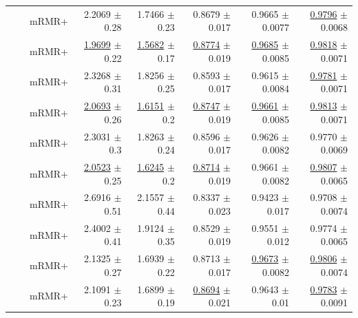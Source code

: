 \begin{longtable}{llp{}rrrrr}
 &  & mRMR+ & 2.2069 {\scriptsize $\pm$ 0.28} & 1.7466 {\scriptsize $\pm$ 0.23} & 0.8679 {\scriptsize $\pm$ 0.017} & 0.9665 {\scriptsize $\pm$ 0.0077} & \underline{0.9796} {\scriptsize $\pm$ 0.0068} \\
 &  & mRMR+ & \underline{1.9699} {\scriptsize $\pm$ 0.22} & \underline{1.5682} {\scriptsize $\pm$ 0.17} & \underline{0.8774} {\scriptsize $\pm$ 0.019} & \underline{0.9685} {\scriptsize $\pm$ 0.0085} & \underline{0.9818} {\scriptsize $\pm$ 0.0071} \\
 &  & mRMR+ & 2.3268 {\scriptsize $\pm$ 0.31} & 1.8256 {\scriptsize $\pm$ 0.25} & 0.8593 {\scriptsize $\pm$ 0.017} & 0.9615 {\scriptsize $\pm$ 0.0084} & \underline{0.9781} {\scriptsize $\pm$ 0.0071} \\
 &  & mRMR+ & \underline{2.0693} {\scriptsize $\pm$ 0.26} & \underline{1.6151} {\scriptsize $\pm$ 0.2} & \underline{0.8747} {\scriptsize $\pm$ 0.019} & \underline{0.9661} {\scriptsize $\pm$ 0.0085} & \underline{0.9813} {\scriptsize $\pm$ 0.0071} \\
 &  & mRMR+ & 2.3031 {\scriptsize $\pm$ 0.3} & 1.8263 {\scriptsize $\pm$ 0.24} & 0.8596 {\scriptsize $\pm$ 0.017} & 0.9626 {\scriptsize $\pm$ 0.0082} & 0.9770 {\scriptsize $\pm$ 0.0069} \\
 &  & mRMR+ & \underline{2.0523} {\scriptsize $\pm$ 0.25} & \underline{1.6245} {\scriptsize $\pm$ 0.2} & \underline{0.8714} {\scriptsize $\pm$ 0.019} & 0.9661 {\scriptsize $\pm$ 0.0082} & \underline{0.9807} {\scriptsize $\pm$ 0.0065} \\
 &  & mRMR+ & 2.6916 {\scriptsize $\pm$ 0.51} & 2.1557 {\scriptsize $\pm$ 0.44} & 0.8337 {\scriptsize $\pm$ 0.023} & 0.9423 {\scriptsize $\pm$ 0.017} & 0.9708 {\scriptsize $\pm$ 0.0074} \\
 &  & mRMR+ & 2.4002 {\scriptsize $\pm$ 0.41} & 1.9124 {\scriptsize $\pm$ 0.35} & 0.8529 {\scriptsize $\pm$ 0.019} & 0.9551 {\scriptsize $\pm$ 0.012} & 0.9774 {\scriptsize $\pm$ 0.0065} \\
 &  & mRMR+ & 2.1325 {\scriptsize $\pm$ 0.27} & 1.6939 {\scriptsize $\pm$ 0.22} & 0.8713 {\scriptsize $\pm$ 0.017} & \underline{0.9673} {\scriptsize $\pm$ 0.0082} & \underline{0.9806} {\scriptsize $\pm$ 0.0074} \\
 &  & mRMR+ & 2.1091 {\scriptsize $\pm$ 0.23} & 1.6899 {\scriptsize $\pm$ 0.19} & \underline{0.8694} {\scriptsize $\pm$ 0.021} & 0.9643 {\scriptsize $\pm$ 0.01} & \underline{0.9783} {\scriptsize $\pm$ 0.0091} \\
\end{longtable}